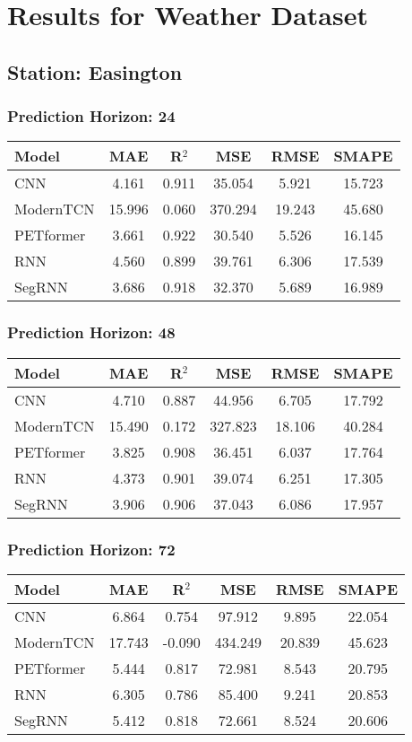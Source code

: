\section*{Results for Weather Dataset}
\subsection*{Station: Easington}
\subsubsection*{Prediction Horizon: 24}
\begin{tabular}{lccccc}
\toprule
Model & MAE & R$^2$ & MSE & RMSE & SMAPE \\
\midrule
CNN & 4.161 & 0.911 & 35.054 & 5.921 & 15.723 \\
ModernTCN & 15.996 & 0.060 & 370.294 & 19.243 & 45.680 \\
PETformer & 3.661 & 0.922 & 30.540 & 5.526 & 16.145 \\
RNN & 4.560 & 0.899 & 39.761 & 6.306 & 17.539 \\
SegRNN & 3.686 & 0.918 & 32.370 & 5.689 & 16.989 \\
\bottomrule
\end{tabular}
\vspace{0.5cm}
\subsubsection*{Prediction Horizon: 48}
\begin{tabular}{lccccc}
\toprule
Model & MAE & R$^2$ & MSE & RMSE & SMAPE \\
\midrule
CNN & 4.710 & 0.887 & 44.956 & 6.705 & 17.792 \\
ModernTCN & 15.490 & 0.172 & 327.823 & 18.106 & 40.284 \\
PETformer & 3.825 & 0.908 & 36.451 & 6.037 & 17.764 \\
RNN & 4.373 & 0.901 & 39.074 & 6.251 & 17.305 \\
SegRNN & 3.906 & 0.906 & 37.043 & 6.086 & 17.957 \\
\bottomrule
\end{tabular}
\vspace{0.5cm}
\subsubsection*{Prediction Horizon: 72}
\begin{tabular}{lccccc}
\toprule
Model & MAE & R$^2$ & MSE & RMSE & SMAPE \\
\midrule
CNN & 6.864 & 0.754 & 97.912 & 9.895 & 22.054 \\
ModernTCN & 17.743 & -0.090 & 434.249 & 20.839 & 45.623 \\
PETformer & 5.444 & 0.817 & 72.981 & 8.543 & 20.795 \\
RNN & 6.305 & 0.786 & 85.400 & 9.241 & 20.853 \\
SegRNN & 5.412 & 0.818 & 72.661 & 8.524 & 20.606 \\
\bottomrule
\end{tabular}
\vspace{0.5cm}

